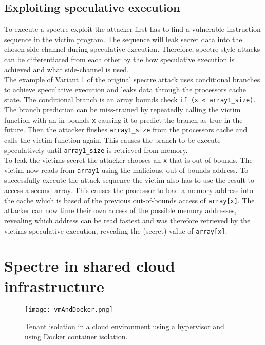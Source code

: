\documentclass[conference,compsoc,final,a4paper]{IEEEtran}
\begin{document}
\subsection{Exploiting speculative execution}
To execute a spectre exploit the attacker first has to find a vulnerable instruction sequence in the victim program. The sequence will leak secret data into the chosen
side-channel during speculative execution. Therefore, spectre-style attacks can be differentiated from each other by the how speculative execution is achieved
and what side-channel is used. \cite{kocher2018spectre} \\
The example of Variant 1 of the original spectre attack uses conditional branches to achieve speculative
execution and leaks data through the processors cache state. The conditional branch is an array bounds check \lstinline|if (x < array1_size)|. The branch prediction
can be miss-trained by repeatedly calling the victim function with an in-bounds \lstinline|x| causing it to predict the branch as true in the future. Then the
attacker flushes \lstinline|array1_size| from the processors cache and calls the victim function again. This causes the branch to be execute speculatively
until \lstinline|array1_size| is retrieved from memory. \\
To leak the victims secret the attacker chooses an \lstinline|x| that is out of bounds. The victim
now reads from \lstinline|array1| using the malicious, out-of-bounds address. To successfully execute the attack sequence the victim also has to use the result to
access a second array. This causes the processor to load a memory address into the cache which is based of the previous out-of-bounds access of \lstinline|array[x]|.
The attacker can now time their own access of the possible memory addresses, revealing which address can be read fastest and was therefore retrieved by the victims
speculative execution, revealing the (secret) value of \lstinline|array[x]|.
\section{Spectre in shared cloud infrastructure}
\begin{figure}[!ht]
\centering
\texttt{[image: vmAndDocker.png]}
\caption{Tenant isolation in a cloud environment using a hypervisor and using Docker container isolation.}
\label{virtmem}
\end{figure}
\end{document}
